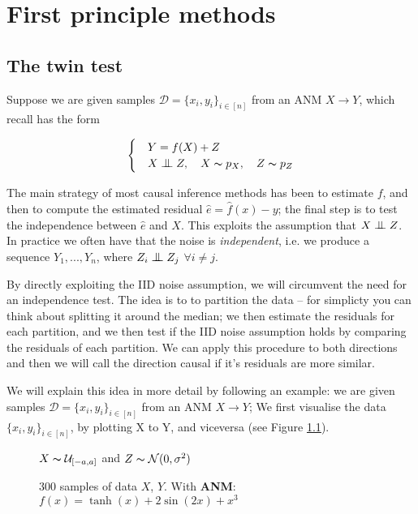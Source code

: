 
\chapter{First principle methods}




\section{The twin test}


Suppose we are given samples $\mathcal{D} = \{x_i, y_i\}_{i \in [n]}$ from an ANM $X \rightarrow Y$, which recall has the form

\[
    \begin{cases} 
        & Y = f(X) + Z \\
        & X \bigCI Z,\quad X \thicksim p_X,\quad Z \thicksim p_{Z}  
     \end{cases}  
\]

The main strategy of most causal inference methods has been to estimate $f$, and then to compute the estimated
residual $\hat{e} = \hat{f}(x) - y$; the final step is to test the independence between $\hat{e}$ and $X$. This exploits 
the assumption that $X \bigCI Z$. In practice we often have that the noise is \textit{independent}, 
i.e. we produce a sequence $Y_1, ..., Y_n$, where $Z_i \bigCI Z_j$ $\forall i \neq j$.

By directly exploiting the IID noise assumption, we will circumvent the need for an independence test. The 
idea is to to partition the data -- for simplicty you can think about splitting it around the median; we 
then estimate the residuals for each partition, and we then test if the IID noise assumption holds by comparing
the residuals of each partition. We can apply this procedure to both directions and then we will call the 
direction causal if it's residuals are more similar. 

We will explain this idea in more detail by following an example: we are given samples 
$\mathcal{D} = \{x_i, y_i\}_{i \in [n]}$ from an ANM $X \rightarrow Y$; 
We first visualise the data $\{x_i, y_i\}_{i \in [n]}$, by plotting
X to Y, and viceversa (see Figure \ref{fig:algo_data}). 

\begin{figure}[H]
    \captionsetup[subfigure]{labelformat=empty}
    \centering

    \caption{300 samples of data $X$, $Y$. With \textbf{ANM}: \\
    $f(x) = \tanh(x) + 2\sin(2x) + x^3$}
    $X \thicksim \mathcal{U}_{[-a, a]}$ and $Z \thicksim \mathcal{N}(0, \sigma^2)$
    \label{fig:algo_data}
\end{figure}



